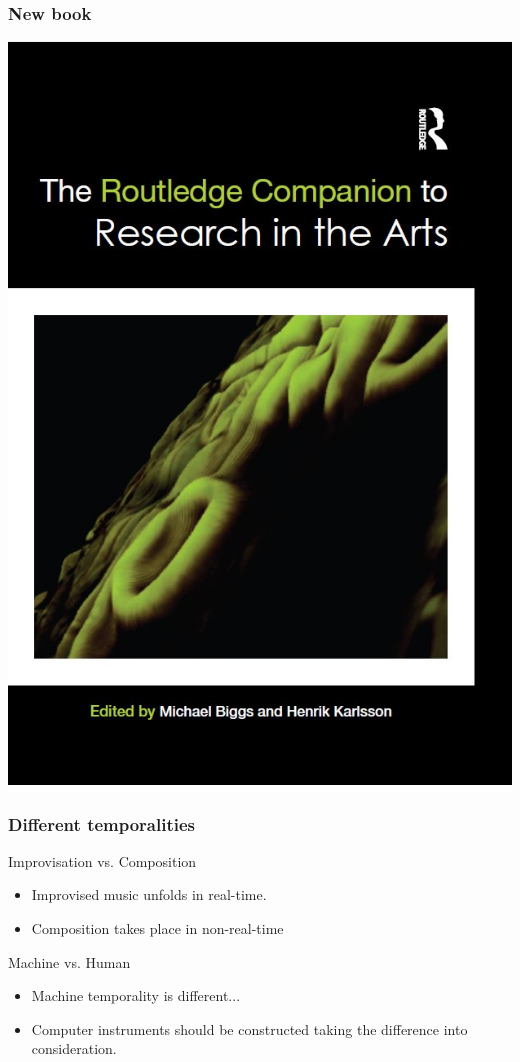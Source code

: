 \documentclass{beamer}
\begin{document}
\begin{frame}
  \frametitle{New book}
  \begin{center}
    \includegraphics[width=.4\textwidth]{img/research-in-the-arts.jpg}
  \end{center}
\end{frame}

\begin{frame}
  \frametitle{Different temporalities}
  \begin{block}{Improvisation vs. Composition}
    \begin{itemize}
    \item <2->Improvised music unfolds in real-time.
    \item <3->Composition takes place in non-real-time
    \end{itemize}
  \end{block}
  \pause[5]
  \begin{block}{Machine vs. Human}
    \begin{itemize}
    \item <5->Machine temporality is different...
    \item <6->Computer instruments should be constructed taking the difference into consideration.
    \end{itemize}
  \end{block}
\end{frame}
\end{document}

